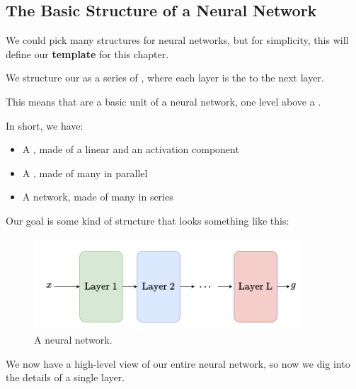     \subsection{The Basic Structure of a Neural Network}
        
        We could pick many structures for neural networks, but for simplicity, this will define our \textbf{template} for this chapter.\\
        
        \begin{definition}
            We structure our  as a series of , where each layer is the  to the next layer.
            
            This means that  are a basic unit of a neural network, one level above a .
        \end{definition}
        
        In short, we have:
        
        \begin{itemize}
            \item A , made of a linear and an activation component
            
            \item A , made of many  in parallel
            
            \item A  network, made of many  in series
        \end{itemize}
        
        Our goal is some kind of structure that looks something like this:
        
        \begin{figure}[H]
            \centering
            \includegraphics[width=100mm,scale=0.4]{images/nn_images/layers.png}
            \caption*{A neural network.}
        \end{figure}
        
        We now have a high-level view of our entire neural network, so now we dig into the details of a single layer.
        
